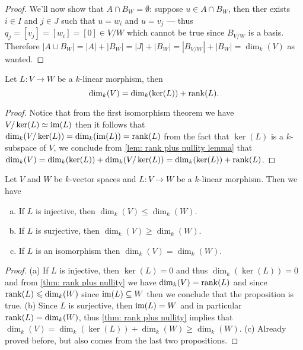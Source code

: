 \begin{proof}
We'll now show that \(A \cap B_W = \emptyset\): suppose \(u \in A \cap B_W\),
then ther exists \(i \in I\) and \(j \in J\) such that \(u = w_i\) and \(u =
v_j\) --- thus \(q_j = [v_j] = [w_i] = [0] \in V/W\) which cannot be true since
\(B_{V/W}\) is a basis. Therefore \(|A \cup B_W| = |A| + |B_W| = |J| + |B_W| =
|B_{V/W}| + |B_W| = \dim_k(V)\) as wanted.
\end{proof}

\begin{theorem}\label{thm: rank plus nullity}
Let \(L : V \to W\) be a \(k\)-linear morphism, then
\[
  \dim_k(V) = \dim_k(\ker(L)) + \operatorname{rank}(L).
\]
\end{theorem}

\begin{proof}
Notice that from the first isomorphism theorem we have \(V/\ker(L) \simeq
\operatorname{im}(L)\) then it follows that \(\dim_k(V/\ker(L)) = \dim_k(\operatorname{im}(L)) =
\operatorname{rank}(L)\) from the fact that \(\ker(L)\) is a \(k\)-subspace of \(V\), we
conclude from \cref{lem: rank plus nullity lemma} that \(\dim_k(V) =
\dim_k(\ker(L)) + \dim_k(V/\ker(L)) = \dim_k(\ker(L)) + \operatorname{rank}(L)\).
\end{proof}

\begin{corollary}
Let \(V\) and \(W\) be \(k\)-vector spaces and \(L : V \to W\) be a
\(k\)-linear morphism. Then we have
\begin{enumerate}[(a).]
  \item If \(L\) is injective, then \(\dim_k(V) \leq \dim_k(W)\).
  \item If \(L\) is surjective, then \(\dim_k(V) \geq \dim_k(W)\).
  \item If \(L\) is an isomorphism then \(\dim_k(V) = \dim_k(W)\).
\end{enumerate}
\end{corollary}

\begin{proof}
(a) If \(L\) is injective, then \(\ker(L) = 0\) and thus \(\dim_k(\ker(L)) =
0\) and from \cref{thm: rank plus nullity} we have \(\dim_k(V) = \operatorname{rank}(L)\) and
since \(\operatorname{rank}(L) \leqslant \dim_k(W)\) since \(\operatorname{im}(L) \subseteq W\) then we
conclude that the proposition is true. (b) Since \(L\) is surjective, then
\(\operatorname{im}(L) = W\) and in particular \(\operatorname{rank}(L) = \dim_k(W)\), thus \cref{thm: rank
plus nullity} implies that  \(\dim_k(V) = \dim_k(\ker(L)) + \dim_k(W) \geq
\dim_k(W)\). (c) Already proved before, but also comes from the last two
propositions.
\end{proof}

